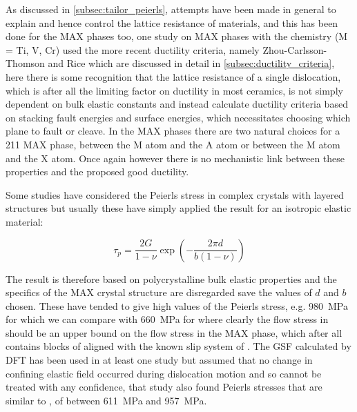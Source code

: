 As discussed in \autoref{subsec:tailor_peierls}, attempts have been made in general to explain and hence control the lattice resistance of materials, and this has been done for the MAX phases too, one study on MAX phases \cite{Music2007ductility} with the chemistry  (M = Ti, V, Cr) used the more recent ductility criteria, namely Zhou-Carlsson-Thomson \cite{Zhou1994} and Rice \cite{Rice1992} which are discussed in detail in \autoref{subsec:ductility_criteria}, here there is some recognition that the lattice resistance of a single dislocation, which is after all the limiting factor on ductility in most ceramics, is not simply dependent on bulk elastic constants and instead calculate ductility criteria based on stacking fault energies and surface energies, which necessitates choosing which plane to fault or cleave. In the MAX phases there are two natural choices for a 211 MAX phase, between the M atom and the A atom or between the M atom and the X atom. Once again however there is no mechanistic link between these properties and the proposed good ductility. 

Some studies have considered the Peierls stress in complex crystals with layered structures \cite{Music2008,Emmerlich2009,Gouriet2015} but usually these have simply applied the result for an isotropic elastic material:

\begin{equation}
\tau_p = \frac{2G}{1-\nu} \exp \left( - \frac{2 \pi d}{b(1-\nu)} \right)
\end{equation}

The result is therefore based on polycrystalline bulk elastic properties and the specifics of the MAX crystal structure are disregarded save the values of $d$ and $b$ chosen. These have tended to give high values of the Peierls stress, e.g. \SI{980}{\mega\pascal} for  \cite{Music2008} which we can compare with \SI{660}{\mega\pascal} for  \cite{Clegg2006} where clearly the flow stress in  should be an upper bound on the flow stress in the MAX phase, which after all contains blocks of  aligned with the known slip system of  \cite{Hollox1966}. The GSF calculated by DFT has been used in at least one study \cite{Gouriet2015} but assumed that no change in confining elastic field occurred during dislocation motion and so cannot be treated with any confidence, that study also found Peierls stresses that are similar to , of between \SI{611}{\mega\pascal} and \SI{957}{\mega\pascal}.

